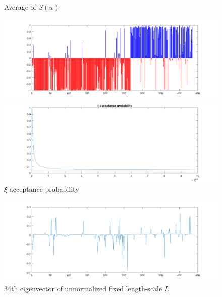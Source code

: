 \documentclass{siamart1116}
\begin{document}
\begin{figure}[!htb]
\begin{minipage}{0.48\textwidth}
    \centering
    \caption{\label{fig:voting_hier_u_avg} Average of $S(u)$}
    \includegraphics[width=\linewidth]{voting/hier/u_avg.png}
\end{minipage} \hfill
\begin{minipage}{0.48\textwidth}
    \centering
    \caption{\label{fig:voting_hier_xi_accept} $\xi$ acceptance probability}
    \includegraphics[width=\linewidth]{voting/hier/xi_accept.png}
\end{minipage}
\end{figure}

\begin{figure}[!htb]
\caption{\label{fig:voting_hier_eigenvector} 34th eigenvector of unnormalized fixed length-scale $L$}
\includegraphics[width=\linewidth]{voting/hier/34_eigvec.png}
\end{figure}
\end{document}
